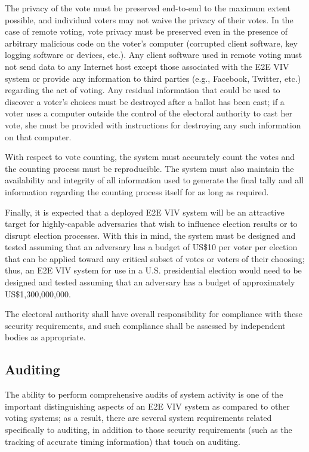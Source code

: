The privacy of the vote must be preserved end-to-end to the maximum
extent possible, and individual voters may not waive the privacy of
their votes. In the case of remote voting, vote privacy must be
preserved even in the presence of arbitrary malicious code on the
voter's computer (corrupted client software, key logging software or
devices, etc.). Any client software used in remote voting must not
send data to any Internet host except those associated with the E2E
VIV system or provide any information to third parties (e.g.,
Facebook, Twitter, etc.) regarding the act of voting. Any residual
information that could be used to discover a voter's choices must be
destroyed after a ballot has been cast; if a voter uses a computer
outside the control of the electoral authority to cast her vote, she
must be provided with instructions for destroying any such information
on that computer.

With respect to vote counting, the system must accurately count the
votes and the counting process must be reproducible. The system must
also maintain the availability and integrity of all information used
to generate the final tally and all information regarding the counting
process itself for as long as required. 

Finally, it is expected that a deployed E2E VIV system will be an
attractive target for highly-capable adversaries that wish to
influence election results or to disrupt election processes. With this
in mind, the system must be designed and tested assuming that an
adversary has a budget of US\$10 per voter per election that can be
applied toward any critical subset of votes or voters of their
choosing; thus, an E2E VIV system for use in a U.S. presidential
election would need to be designed and tested assuming that an
adversary has a budget of approximately US\$1,300,000,000.

The electoral authority shall have overall responsibility for
compliance with these security requirements, and such compliance shall
be assessed by independent bodies as appropriate.

\subsection{Auditing}

The ability to perform comprehensive audits of system activity is one
of the important distinguishing aspects of an E2E VIV system as
compared to other voting systems; as a result, there are several
system requirements related specifically to auditing, in addition to
those security requirements (such as the tracking of accurate timing
information) that touch on auditing.


